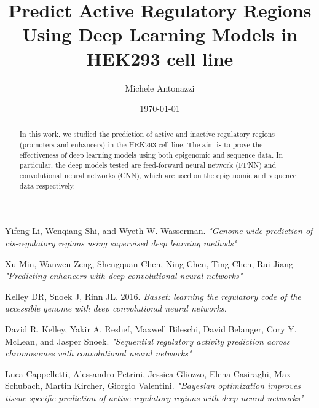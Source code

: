 \documentclass[letterpaper,12pt]{article}
\begin{document}
\title{Predict Active Regulatory Regions Using Deep Learning Models in HEK293 cell line}
\author{Michele Antonazzi}
\date{\today}
\maketitle

\begin{abstract}
In this work, we studied the prediction of active and inactive regulatory regions (promoters and enhancers) in the HEK293 cell line. 
The aim is to prove the effectiveness of deep learning models using both epigenomic and sequence data. In particular, the deep models tested are feed-forward neural network (FFNN) and convolutional neural networks (CNN), which are used on the epigenomic and sequence data respectively.
\end{abstract}


\newpage



\newpage




\newpage
\begin{thebibliography}{99}

\bibitem{}
Yifeng Li, Wenqiang Shi, and Wyeth W. Wasserman. \textit{"Genome-wide
prediction of cis-regulatory regions using supervised deep learning
methods"}

\bibitem{}
Xu Min, Wanwen Zeng, Shengquan Chen, Ning Chen, Ting Chen, Rui Jiang \textit{"Predicting enhancers with deep convolutional
neural networks"}

\bibitem{}
Kelley DR, Snoek J, Rinn JL. 2016. \textit{Basset: learning the
regulatory code of the accessible genome with deep convolutional neural
networks.}

\bibitem{}
 David R. Kelley, Yakir A. Reshef, Maxwell Bileschi, David
Belanger, Cory Y. McLean, and Jasper Snoek. \textit{"Sequential regulatory
activity prediction across chromosomes with convolutional neural
networks"}

\bibitem{}
Luca Cappelletti, Alessandro Petrini, Jessica Gliozzo, Elena
Casiraghi, Max Schubach, Martin Kircher, Giorgio Valentini. \textit{"Bayesian
optimization improves tissue-specific prediction of active regulatory
regions with deep neural networks"}

\end{thebibliography}
\end{document}
